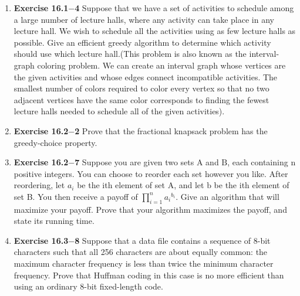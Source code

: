 \documentclass[a4paper,11pt,oneside]{book}
\begin{document}
\noindent{}
\normalsize

\begin{enumerate}
  \item {\textbf{Exercise 16.1$-$4}} Suppose that we have a set of activities to schedule among a large number of lecture halls,
  where any activity can take place in any lecture hall. We wish to schedule all the activities using
  as few lecture halls as possible. Give an efficient greedy algorithm to determine which activity
  should use which lecture hall.(This problem is also known as the interval-graph coloring problem. We can create an interval
  graph whose vertices are the given activities and whose edges connect incompatible activities.
  The smallest number of colors required to color every vertex so that no two adjacent vertices
  have the same color corresponds to finding the fewest lecture halls needed to schedule all of the
  given activities).

  \item {\textbf{Exercise 16.2$-$2}} Prove that the fractional knapsack problem has the greedy-choice property.
  
  \item {\textbf{Exercise 16.2$-$7}} Suppose you are given two sets $\mathrm{A}$ and $\mathrm{B}$, each containing $\mathrm{n}$ positive integers. You can choose to reorder each set however you like. After reordering, let $a_i$ be the ith element of set $\mathrm{A}$, and let $\mathrm{b}$ be the ith element of set B. You then receive a payoff of $\prod_{i=1}^n a_i{ }^{b_i}$. Give an algorithm that will maximize your payoff. Prove that your algorithm maximizes the payoff, and state its running time.
 
  \item {\textbf{Exercise 16.3$-$8}} Suppose that a data file contains a sequence of 8-bit characters such that all 256 characters are
  about equally common: the maximum character frequency is less than twice the minimum
  character frequency. Prove that Huffman coding in this case is no more efficient than using an
  ordinary 8-bit fixed-length code.


\end{enumerate}
\end{document}
